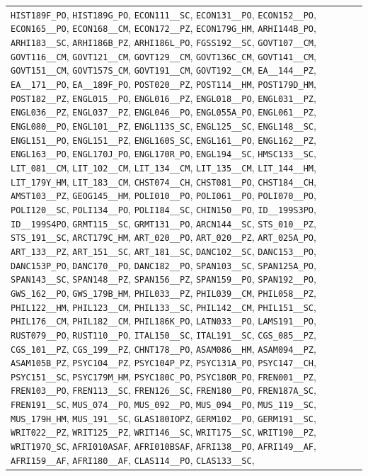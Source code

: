 \begin{longtable}{|p{4.4in}|p{4.4in}|}
\verb|HIST189F_PO|, \verb|HIST189G_PO|, \verb|ECON111__SC|, \verb|ECON131__PO|, \verb|ECON152__PO|, \verb|ECON165__PO|, \verb|ECON168__CM|, \verb|ECON172__PZ|, \verb|ECON179G_HM|, \verb|ARHI144B_PO|, \verb|ARHI183__SC|, \verb|ARHI186B_PZ|, \verb|ARHI186L_PO|, \verb|FGSS192__SC|, \verb|GOVT107__CM|, \verb|GOVT116__CM|, \verb|GOVT121__CM|, \verb|GOVT129__CM|, \verb|GOVT136C_CM|, \verb|GOVT141__CM|, \verb|GOVT151__CM|, \verb|GOVT157S_CM|, \verb|GOVT191__CM|, \verb|GOVT192__CM|, \verb|EA__144__PZ|, \verb|EA__171__PO|, \verb|EA__189F_PO|, \verb|POST020__PZ|, \verb|POST114__HM|, \verb|POST179D_HM|, \verb|POST182__PZ|, \verb|ENGL015__PO|, \verb|ENGL016__PZ|, \verb|ENGL018__PO|, \verb|ENGL031__PZ|, \verb|ENGL036__PZ|, \verb|ENGL037__PZ|, \verb|ENGL046__PO|, \verb|ENGL055A_PO|, \verb|ENGL061__PZ|, \verb|ENGL080__PO|, \verb|ENGL101__PZ|, \verb|ENGL113S_SC|, \verb|ENGL125__SC|, \verb|ENGL148__SC|, \verb|ENGL151__PO|, \verb|ENGL151__PZ|, \verb|ENGL160S_SC|, \verb|ENGL161__PO|, \verb|ENGL162__PZ|, \verb|ENGL163__PO|, \verb|ENGL170J_PO|, \verb|ENGL170R_PO|, \verb|ENGL194__SC|, \verb|HMSC133__SC|, \verb|LIT_081__CM|, \verb|LIT_102__CM|, \verb|LIT_134__CM|, \verb|LIT_135__CM|, \verb|LIT_144__HM|, \verb|LIT_179Y_HM|, \verb|LIT_183__CM|, \verb|CHST074__CH|, \verb|CHST081__PO|, \verb|CHST184__CH|, \verb|AMST103__PZ|, \verb|GEOG145__HM|, \verb|POLI010__PO|, \verb|POLI061__PO|, \verb|POLI070__PO|, \verb|POLI120__SC|, \verb|POLI134__PO|, \verb|POLI184__SC|, \verb|CHIN150__PO|, \verb|ID__199S3PO|, \verb|ID__199S4PO|, \verb|GRMT115__SC|, \verb|GRMT131__PO|, \verb|ARCN144__SC|, \verb|STS_010__PZ|, \verb|STS_191__SC|, \verb|ARCT179C_HM|, \verb|ART_020__PO|, \verb|ART_020__PZ|, \verb|ART_025A_PO|, \verb|ART_133__PZ|, \verb|ART_151__SC|, \verb|ART_181__SC|, \verb|DANC102__SC|, \verb|DANC153__PO|, \verb|DANC153P_PO|, \verb|DANC170__PO|, \verb|DANC182__PO|, \verb|SPAN103__SC|, \verb|SPAN125A_PO|, \verb|SPAN143__SC|, \verb|SPAN148__PZ|, \verb|SPAN156__PZ|, \verb|SPAN159__PO|, \verb|SPAN192__PO|, \verb|GWS_162__PO|, \verb|GWS_179B_HM|, \verb|PHIL033__PZ|, \verb|PHIL039__CM|, \verb|PHIL058__PZ|, \verb|PHIL122__HM|, \verb|PHIL123__CM|, \verb|PHIL133__SC|, \verb|PHIL142__CM|, \verb|PHIL151__SC|, \verb|PHIL176__CM|, \verb|PHIL182__CM|, \verb|PHIL186K_PO|, \verb|LATN033__PO|, \verb|LAMS191__PO|, \verb|RUST079__PO|, \verb|RUST110__PO|, \verb|ITAL150__SC|, \verb|ITAL191__SC|, \verb|CGS_085__PZ|, \verb|CGS_101__PZ|, \verb|CGS_199__PZ|, \verb|CHNT178__PO|, \verb|ASAM086__HM|, \verb|ASAM094__PZ|, \verb|ASAM105B_PZ|, \verb|PSYC104__PZ|, \verb|PSYC104P_PZ|, \verb|PSYC131A_PO|, \verb|PSYC147__CH|, \verb|PSYC151__SC|, \verb|PSYC179M_HM|, \verb|PSYC180C_PO|, \verb|PSYC180R_PO|, \verb|FREN001__PZ|, \verb|FREN103__PO|, \verb|FREN113__SC|, \verb|FREN126__SC|, \verb|FREN180__PO|, \verb|FREN187A_SC|, \verb|FREN191__SC|, \verb|MUS_074__PO|, \verb|MUS_092__PO|, \verb|MUS_094__PO|, \verb|MUS_119__SC|, \verb|MUS_179H_HM|, \verb|MUS_191__SC|, \verb|GLAS180IOPZ|, \verb|GERM102__PO|, \verb|GERM191__SC|, \verb|WRIT022__PZ|, \verb|WRIT125__PZ|, \verb|WRIT146__SC|, \verb|WRIT175__SC|, \verb|WRIT190__PZ|, \verb|WRIT197Q_SC|, \verb|AFRI010ASAF|, \verb|AFRI010BSAF|, \verb|AFRI138__PO|, \verb|AFRI149__AF|, \verb|AFRI159__AF|, \verb|AFRI180__AF|, \verb|CLAS114__PO|, \verb|CLAS133__SC|, 
\end{longtable}
